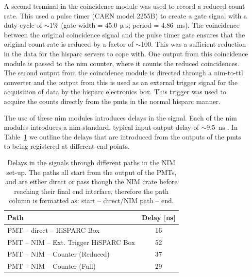 A second terminal in the coincidence module was used to record a reduced count rate. This used a pulse timer (CAEN model 2255B) to create a gate signal with a duty cycle of $\sim 1\%$ (gate width = $45.0 \, \upmu\mathrm{s}$; period = $4.86$~ms). The coincidence between the original coincidence signal and the pulse timer gate ensures that the original count rate is reduced by a factor of $\sim$100. This was a sufficient reduction in the data for the \gls{hisparc} servers to cope with. One output from this coincidence module is passed to the \gls{nim} counter, where it counts the reduced coincidences. The second output from the coincidence module is directed through a \gls{nim}-to-\gls{ttl} converter and the output from this is used as an external trigger signal for the acquisition of data by the \gls{hisparc} electronics box. This trigger was used to acquire the counts directly from the \glspl{pmt} in the normal \gls{hisparc} manner.%

The use of these \gls{nim} modules introduces delays in the signal. Each of the \gls{nim} modules introduces a \gls{nim}-standard, typical input-output delay of $\sim$9.5~ns \citep{lecroy_lecroy_1996, caen_technical_2011}. In Table~\ref{tab:HS_14008_delays} we outline the delays that are introduced from the outputs of the \glspl{pmt} to being registered at different end-points.

\vspace{1em}

\begin{table}[ht!]
	\begin{center}
		\caption{Delays in the signals through different paths in the NIM set-up. The paths all start from the output of the PMTs, and are either direct or pass though the NIM crate before reaching their final end interface, therefore the path column is formatted as: start -- direct/NIM path -- end.}
		\label{tab:HS_14008_delays}
		\begin{tabular}{l c }
			\hline 
			{\bf Path} & {\bf Delay [ns]} \\ 
			\hline 
			PMT -- direct -- HiSPARC Box &  16 \\ 
			PMT -- NIM -- Ext. Trigger HiSPARC Box & 52 \\ 
			PMT -- NIM -- Counter (Reduced) & 37 \\ 
			PMT -- NIM -- Counter (Full) & 29 \\ 
			\hline 
		\end{tabular} 
	\end{center}
\end{table}

